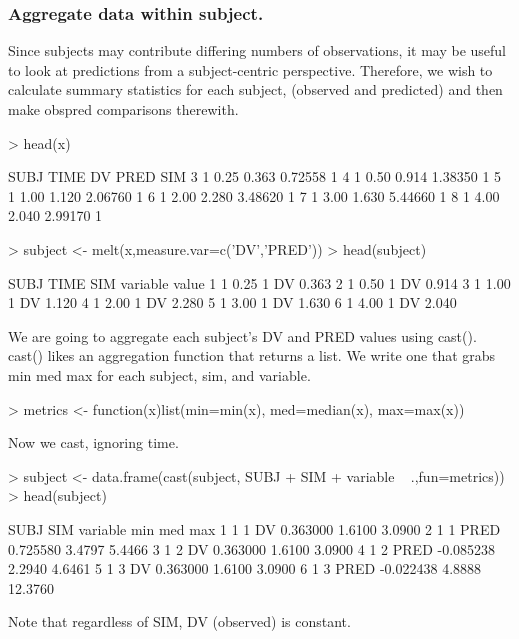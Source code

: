 \subsubsection{Aggregate data within subject.}
Since subjects may contribute differing numbers of observations, it may
be useful to look at predictions from a subject-centric perspective.
Therefore, we wish to calculate summary statistics for each subject, 
(observed and predicted) and then make obspred comparisons therewith.
\begin{Schunk}
\begin{Sinput}
> head(x)
\end{Sinput}
\begin{Soutput}
  SUBJ TIME    DV    PRED SIM
3    1 0.25 0.363 0.72558   1
4    1 0.50 0.914 1.38350   1
5    1 1.00 1.120 2.06760   1
6    1 2.00 2.280 3.48620   1
7    1 3.00 1.630 5.44660   1
8    1 4.00 2.040 2.99170   1
\end{Soutput}
\begin{Sinput}
> subject <- melt(x,measure.var=c('DV','PRED'))
> head(subject)
\end{Sinput}
\begin{Soutput}
  SUBJ TIME SIM variable value
1    1 0.25   1       DV 0.363
2    1 0.50   1       DV 0.914
3    1 1.00   1       DV 1.120
4    1 2.00   1       DV 2.280
5    1 3.00   1       DV 1.630
6    1 4.00   1       DV 2.040
\end{Soutput}
\end{Schunk}
We are going to aggregate each subject's DV and PRED values using cast().
cast() likes an aggregation function that returns a list.
We write one that grabs min med max for each subject, sim, and variable.
\begin{Schunk}
\begin{Sinput}
> metrics <- function(x)list(min=min(x), med=median(x), max=max(x))
\end{Sinput}
\end{Schunk}
Now we cast, ignoring time.
\begin{Schunk}
\begin{Sinput}
> subject <- data.frame(cast(subject, SUBJ + SIM + variable ~ .,fun=metrics))
> head(subject)
\end{Sinput}
\begin{Soutput}
  SUBJ SIM variable       min    med     max
1    1   1       DV  0.363000 1.6100  3.0900
2    1   1     PRED  0.725580 3.4797  5.4466
3    1   2       DV  0.363000 1.6100  3.0900
4    1   2     PRED -0.085238 2.2940  4.6461
5    1   3       DV  0.363000 1.6100  3.0900
6    1   3     PRED -0.022438 4.8888 12.3760
\end{Soutput}
\end{Schunk}
Note that regardless of SIM, DV (observed) is constant.

